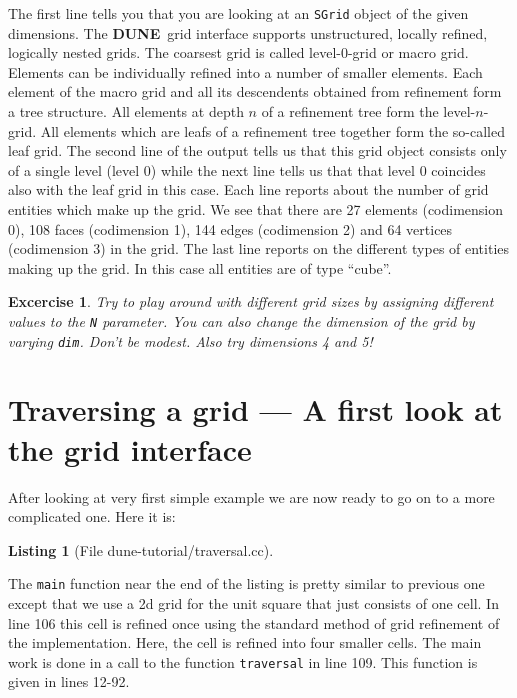 \documentclass[11pt,a4paper,headinclude,footinclude,DIV14,BCOR8.25mm,titlepage,twoside,openright,normalheadings]{scrreprt}
\newcommand{\Dune}{{\sf\bfseries DUNE}}
\newtheorem{exc}{Excercise}[chapter]
\newtheorem{lst}{Listing}
\begin{document}
The first line tells you that you are looking at an \lstinline!SGrid!
object of the given dimensions. The \Dune\ grid interface supports
unstructured, locally refined, logically nested grids. The coarsest
grid is called level-0-grid or macro grid. Elements can be
individually refined into a number of smaller elements. Each element
of the macro grid and all its descendents obtained from refinement
form a tree structure. All elements at depth $n$ of a refinement tree
form the level-$n$-grid. All elements which are leafs of a refinement
tree together form the so-called leaf grid. The second line of the
output tells us that this grid object consists only of a single level
(level $0$) while the next line tells us that that level 0 coincides
also with the leaf grid in this case. Each line reports about the
number of grid entities which make up the grid. We see that there are
27 elements (codimension 0), 108 faces (codimension 1), 144 edges
(codimension 2) and 64 vertices (codimension 3) in the grid. The last
line reports on the different types of entities making up the grid. In
this case all entities are of type ``cube''.

\begin{exc} Try to play around with different grid sizes by assigning
  different values to the \lstinline!N! parameter. You can also change
  the dimension of the grid by varying \lstinline!dim!. Don't be
  modest. Also try dimensions 4 and 5!
\end{exc}

\section{Traversing a grid --- A first look at the grid interface}

After looking at very first simple example we are now ready to go on
to a more complicated one. Here it is:

\begin{lst}[File dune-tutorial/traversal.cc] \mbox{}
\nopagebreak

\end{lst}

The \lstinline!main! function near the end of the listing
is pretty similar to previous one except
that we use a 2d grid for the unit square that just consists of one
cell. In line 106 this cell is refined once using the standard method
of grid refinement of the implementation. Here, the cell is refined
into four smaller cells. The main work is done in a
call to the function \lstinline!traversal! in line 109. 
This function is given in lines 12-92.
\end{document}
